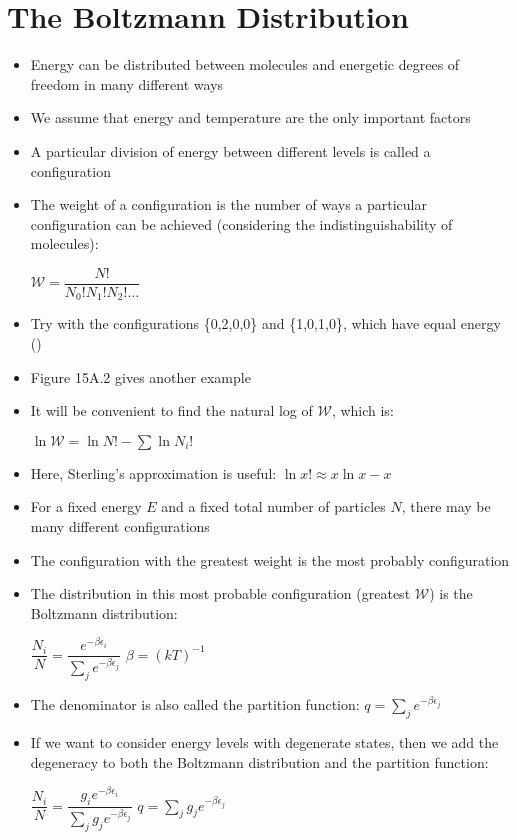 \documentclass[12pt, openany, letterpaper]{memoir}
\begin{document}
\section{The Boltzmann Distribution}
\begin{itemize}
	\item Energy can be distributed between molecules and energetic degrees of freedom in many different ways
	\item We assume that energy and temperature are the only important factors
	\item A particular division of energy between different levels is called a configuration
	\item The weight of a configuration is the number of ways a particular configuration can be achieved (considering the indistinguishability of molecules): 
	
	$\mathcal{W} = \dfrac{N!}{N_0!N_1!N_2!\ldots}$
	\item Try with the configurations \{0,2,0,0\} and \{1,0,1,0\}, which have equal energy ()
	\item Figure 15A.2 gives another example
	\item It will be convenient to find the natural log of $\mathcal{W}$, which is:
	
	$\ln\mathcal{W} = \ln N! - \sum \ln N_i!$
	\item Here, Sterling's approximation is useful: $\ln x! \approx x\ln x - x$
	\item For a fixed energy $E$ and a fixed total number of particles $N$, there may be many different configurations
	\item The configuration with the greatest weight is the most probably configuration
	\item The distribution in this most probable configuration (greatest $\mathcal{W}$) is the Boltzmann distribution:
	
	$\dfrac{N_i}{N}=\dfrac{e^{-\beta \epsilon_i}}{\displaystyle\sum\limits_j e^{-\beta \epsilon_j}}$ \hspace{2em} $\beta = \left(kT\right)^{-1}$
	\item The denominator is also called the partition function: $q = \displaystyle\sum\limits_j e^{-\beta \epsilon_j}$
	\item If we want to consider energy levels with degenerate states, then we add the degeneracy to both the Boltzmann distribution and the partition function:
	
	$\dfrac{N_i}{N}=\dfrac{g_ie^{-\beta \epsilon_i}}{\displaystyle\sum\limits_j g_je^{-\beta \epsilon_j}}$ \hspace{2em}  $q = \displaystyle\sum\limits_j g_je^{-\beta \epsilon_j}$	
\end{itemize}
\end{document}
